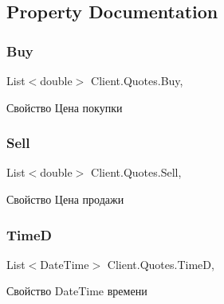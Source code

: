 \subsection{Property Documentation}
\hypertarget{class_client_1_1_quotes_aa463872ba799c9055b58317a67054380}{}\label{class_client_1_1_quotes_aa463872ba799c9055b58317a67054380} 
\subsubsection{\texorpdfstring{Buy}{Buy}}
{\footnotesize\ttfamily List$<$double$>$ Client.\+Quotes.\+Buy\hspace{0.3cm}{\ttfamily [get]}, {\ttfamily [set]}}



Свойство Цена покупки 

\hypertarget{class_client_1_1_quotes_a1698632e2256c00f24b93f2522873543}{}\label{class_client_1_1_quotes_a1698632e2256c00f24b93f2522873543} 
\subsubsection{\texorpdfstring{Sell}{Sell}}
{\footnotesize\ttfamily List$<$double$>$ Client.\+Quotes.\+Sell\hspace{0.3cm}{\ttfamily [get]}, {\ttfamily [set]}}



Свойство Цена продажи 

\hypertarget{class_client_1_1_quotes_ab88e290663293d1f95e03a53092fd3f1}{}\label{class_client_1_1_quotes_ab88e290663293d1f95e03a53092fd3f1} 
\subsubsection{\texorpdfstring{TimeD}{TimeD}}
{\footnotesize\ttfamily List$<$Date\+Time$>$ Client.\+Quotes.\+TimeD\hspace{0.3cm}{\ttfamily [get]}, {\ttfamily [set]}}



Свойство Date\+Time времени 

\hypertarget{class_client_1_1_quotes_a646cfb67c50e4740c690ab25aed48e00}{}\label{class_client_1_1_quotes_a646cfb67c50e4740c690ab25aed48e00} 
